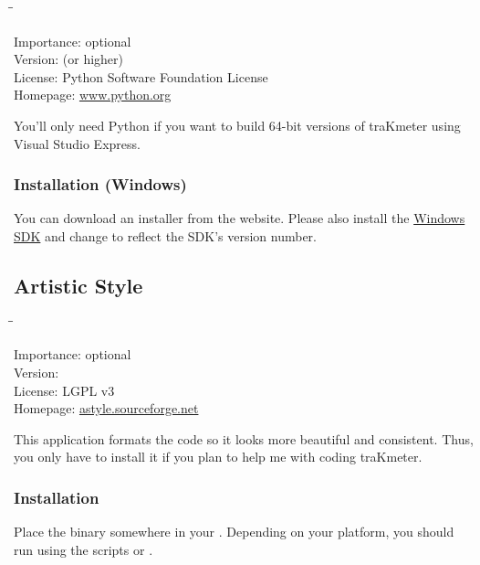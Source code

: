 \begin{tabbing}
  \hspace*{6em}\=\=\kill

  Importance:  \> optional \\
  Version:      (or higher) \\
  License:     \> Python Software Foundation License \\
  Homepage:    \> \href{http://www.python.org/}{www.python.org}
\end{tabbing}

You'll only need Python if you want to build \num{64}-bit versions of
traKmeter using Visual Studio Express.

\subsubsection{Installation (Windows)}

You can download an installer from the website.  Please also install
the \href{http://msdn.microsoft.com/windows/bb980924.aspx}{Windows
  SDK} and change  to reflect the SDK's version
number.

\subsection{Artistic Style}

\begin{tabbing}
  \hspace*{6em}\=\=\kill

  Importance:  \> optional \\
  Version:      \\
  License:     \> LGPL v3 \\
  Homepage:    \> \href{http://astyle.sourceforge.net/}{astyle.sourceforge.net}
\end{tabbing}

This application formats the code so it looks more beautiful and
consistent.  Thus, you only have to install it if you plan to help me
with coding traKmeter.

\subsubsection{Installation}

Place the binary somewhere in your .  Depending on your
platform, you should run  using the scripts
 or .

